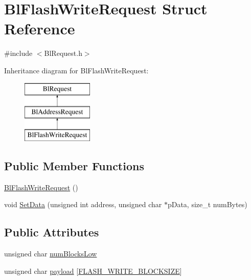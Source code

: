 \hypertarget{struct_bl_flash_write_request}{\section{Bl\-Flash\-Write\-Request Struct Reference}
\label{struct_bl_flash_write_request}
}


{\ttfamily \#include $<$Bl\-Request.\-h$>$}

Inheritance diagram for Bl\-Flash\-Write\-Request\-:\begin{figure}[H]
\begin{center}
\leavevmode
\includegraphics[height=3.000000cm]{struct_bl_flash_write_request}
\end{center}
\end{figure}
\subsection*{Public Member Functions}
\begin{DoxyCompactItemize}
\item 
\hyperlink{struct_bl_flash_write_request_a75a82feb7af0d39c306d9abd258d5b22}{Bl\-Flash\-Write\-Request} ()
\item 
void \hyperlink{struct_bl_flash_write_request_acf26fc08c3d7fe8d36cc195faee09ac8}{Set\-Data} (unsigned int address, unsigned char $\ast$p\-Data, size\-\_\-t num\-Bytes)
\end{DoxyCompactItemize}
\subsection*{Public Attributes}
\begin{DoxyCompactItemize}
\item 
unsigned char \hyperlink{struct_bl_flash_write_request_abff06b9442ac201c7bfb163705c90cf5}{num\-Blocks\-Low}
\item 
unsigned char \hyperlink{struct_bl_flash_write_request_af4981efac8d54dcf31f7666f22df17f5}{payload} \mbox{[}\hyperlink{_bl_request_8h_ae93d0b04d7bc152e72713dc07fcc1e9f}{F\-L\-A\-S\-H\-\_\-\-W\-R\-I\-T\-E\-\_\-\-B\-L\-O\-C\-K\-S\-I\-Z\-E}\mbox{]}
\end{DoxyCompactItemize}


